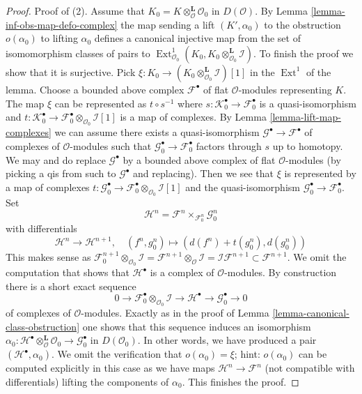 \documentclass{stacks-project}
\theoremstyle{plain}
\theoremstyle{definition}
\theoremstyle{remark}
\numberwithin{equation}{subsection}
\def\Ext{\mathop{\mathrm{Ext}}\nolimits}
\begin{document}
\begin{proof}
\medskip\noindent
Proof of (2).
Assume that $K_0 = K \otimes_\mathcal{O}^\mathbf{L} \mathcal{O}_0$
in $D(\mathcal{O})$. By Lemma \ref{lemma-inf-obs-map-defo-complex}
the map sending a lift $(K', \alpha_0)$ to the obstruction $o(\alpha_0)$
to lifting $\alpha_0$ defines a canonical injective map
from the set of isomomorphism classes of pairs
to $\Ext^1_{\mathcal{O}_0}(K_0,
K_0 \otimes_{\mathcal{O}_0}^\mathbf{L} \mathcal{I})$.
To finish the proof we show that it is surjective.
Pick $\xi : K_0 \to (K_0 \otimes_{\mathcal{O}_0}^\mathbf{L} \mathcal{I})[1]$
in the $\Ext^1$ of the lemma.
Choose a bounded above complex $\mathcal{F}^\bullet$
of flat $\mathcal{O}$-modules representing $K$.
The map $\xi$ can be represented as $t \circ s^{-1}$
where $s : \mathcal{K}_0^\bullet \to \mathcal{F}_0^\bullet$
is a quasi-isomorphism and
$t : \mathcal{K}_0^\bullet \to
\mathcal{F}_0^\bullet \otimes_{\mathcal{O}_0} \mathcal{I}[1]$
is a map of complexes.
By Lemma \ref{lemma-lift-map-complexes}
we can assume there exists a quasi-isomorphism
$\mathcal{G}^\bullet \to \mathcal{F}^\bullet$
of complexes of $\mathcal{O}$-modules
such that $\mathcal{G}_0^\bullet \to \mathcal{F}_0^\bullet$
factors through $s$ up to homotopy.
We may and do replace $\mathcal{G}^\bullet$ by a bounded
above complex of flat $\mathcal{O}$-modules (by picking a qis
from such to $\mathcal{G}^\bullet$ and replacing).
Then we see that $\xi$ is represented by
a map of complexes
$t : \mathcal{G}_0^\bullet \to
\mathcal{F}_0^\bullet \otimes_{\mathcal{O}_0} \mathcal{I}[1]$
and the quasi-isomorphism $\mathcal{G}_0^\bullet \to \mathcal{F}_0^\bullet$.
Set
$$
\mathcal{H}^n = \mathcal{F}^n \times_{\mathcal{F}_0^n} \mathcal{G}_0^n
$$
with differentials
$$
\mathcal{H}^n \to \mathcal{H}^{n + 1},\quad
(f^n, g_0^n) \mapsto (d(f^n) + t(g_0^n), d(g_0^n))
$$
This makes sense as
$\mathcal{F}_0^{n + 1} \otimes_{\mathcal{O}_0} \mathcal{I} =
\mathcal{F}^{n + 1} \otimes_\mathcal{O} \mathcal{I} =
\mathcal{I}\mathcal{F}^{n + 1} \subset \mathcal{F}^{n + 1}$.
We omit the computation that shows that $\mathcal{H}^\bullet$
is a complex of $\mathcal{O}$-modules. By construction there is
a short exact sequence
$$
0 \to \mathcal{F}_0^\bullet \otimes_{\mathcal{O}_0} \mathcal{I} \to
\mathcal{H}^\bullet \to \mathcal{G}_0^\bullet \to 0
$$
of complexes of $\mathcal{O}$-modules.
Exactly as in the proof of Lemma \ref{lemma-canonical-class-obstruction}
one shows that this sequence induces an isomorphism
$\alpha_0 :
\mathcal{H}^\bullet \otimes_\mathcal{O}^\mathbf{L} \mathcal{O}_0 \to
\mathcal{G}_0^\bullet$ in $D(\mathcal{O}_0)$.
In other words, we have produced a pair $(\mathcal{H}^\bullet, \alpha_0)$.
We omit the verification that $o(\alpha_0) = \xi$; hint: $o(\alpha_0)$
can be computed explicitly in this case as we have maps
$\mathcal{H}^n \to \mathcal{F}^n$ (not compatible with differentials)
lifting the components of $\alpha_0$. This finishes the proof.
\end{proof}
















\end{document}
